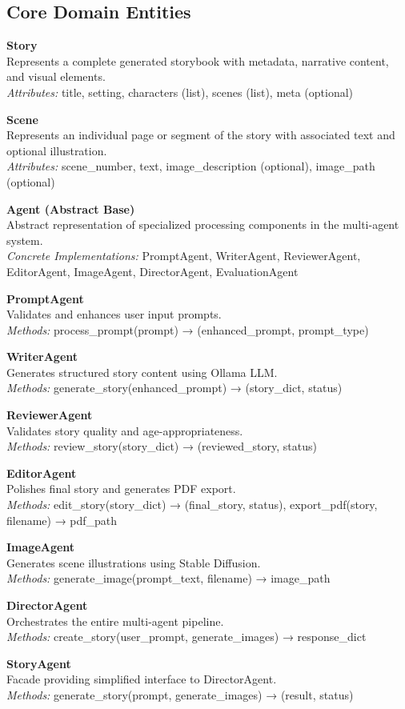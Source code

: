 \subsection{Core Domain Entities}

\textbf{Story}\\
Represents a complete generated storybook with metadata, narrative content, and visual elements.\\
\textit{Attributes:} title, setting, characters (list), scenes (list), meta (optional)

\textbf{Scene}\\
Represents an individual page or segment of the story with associated text and optional illustration.\\
\textit{Attributes:} scene\_number, text, image\_description (optional), image\_path (optional)

\textbf{Agent (Abstract Base)}\\
Abstract representation of specialized processing components in the multi-agent system.\\
\textit{Concrete Implementations:} PromptAgent, WriterAgent, ReviewerAgent, EditorAgent, ImageAgent, DirectorAgent, EvaluationAgent

\textbf{PromptAgent}\\
Validates and enhances user input prompts.\\
\textit{Methods:} process\_prompt(prompt) → (enhanced\_prompt, prompt\_type)

\textbf{WriterAgent}\\
Generates structured story content using Ollama LLM.\\
\textit{Methods:} generate\_story(enhanced\_prompt) → (story\_dict, status)

\textbf{ReviewerAgent}\\
Validates story quality and age-appropriateness.\\
\textit{Methods:} review\_story(story\_dict) → (reviewed\_story, status)

\textbf{EditorAgent}\\
Polishes final story and generates PDF export.\\
\textit{Methods:} edit\_story(story\_dict) → (final\_story, status), export\_pdf(story, filename) → pdf\_path

\textbf{ImageAgent}\\
Generates scene illustrations using Stable Diffusion.\\
\textit{Methods:} generate\_image(prompt\_text, filename) → image\_path

\textbf{DirectorAgent}\\
Orchestrates the entire multi-agent pipeline.\\
\textit{Methods:} create\_story(user\_prompt, generate\_images) → response\_dict

\textbf{StoryAgent}\\
Facade providing simplified interface to DirectorAgent.\\
\textit{Methods:} generate\_story(prompt, generate\_images) → (result, status)

\clearpage
